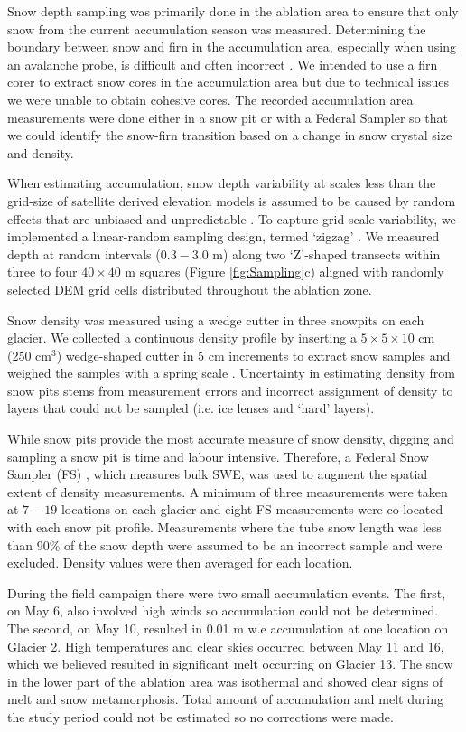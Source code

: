 \documentclass[twocolumn,letterpaper]{igs}
\begin{document}
Snow depth sampling was primarily done in the ablation area to ensure that only snow from the current accumulation season was measured. Determining the boundary between snow and firn in the accumulation area, especially when using an avalanche probe, is difficult and often incorrect \citep{Grunewald2010,Sold2013}. We intended to use a firn corer to extract snow cores in the accumulation area but due to technical issues we were unable to obtain cohesive cores. The recorded accumulation area measurements were done either in a snow pit or with a Federal Sampler so that we could identify the snow-firn transition based on a change in snow crystal size and density. 

When estimating accumulation, snow depth variability at scales less than the grid-size of satellite derived elevation models is assumed to be caused by random effects that are unbiased and unpredictable \citep{Watson2006}. To capture grid-scale variability, we implemented a linear-random sampling design, termed `zigzag' \citep{Shea2010}. We measured depth at random intervals ($0.3 - 3.0$ m) along two `Z'-shaped transects within three to four $40\times40$ m squares (Figure \ref{fig:Sampling}c) aligned with randomly selected DEM grid cells distributed throughout the ablation zone.

Snow density was measured using a wedge cutter in three snowpits on each glacier. We collected a continuous density profile by inserting a $5\times5\times 10$ cm (250 cm$^3$) wedge-shaped cutter in 5 cm increments to extract snow samples and weighed the samples with a spring scale \citep[e.g.][]{Gray1981,Fierz2009}. Uncertainty in estimating density from snow pits stems from measurement errors and incorrect assignment of density to layers that could not be sampled (i.e. ice lenses and `hard' layers). 

While snow pits provide the most accurate measure of snow density, digging and sampling a snow pit is time and labour intensive. Therefore, a Federal Snow Sampler (FS) \citep{Clyde1932}, which measures bulk SWE, was used to augment the spatial extent of density measurements. A minimum of three measurements were taken at $7-19$ locations on each glacier and eight FS measurements were co-located with each snow pit profile. Measurements where the tube snow length was less than 90\% of the snow depth were assumed to be an incorrect sample and were excluded. Density values were then averaged for each location. 

During the field campaign there were two small accumulation events. The first, on May 6, also involved high winds so accumulation could not be determined. The second, on May 10, resulted in 0.01 m w.e accumulation at one location on Glacier 2. High temperatures and clear skies occurred between May 11 and 16, which we believed resulted in significant melt occurring on Glacier 13. The snow in the lower part of the ablation area was isothermal and showed clear signs of melt and snow metamorphosis. Total amount of accumulation and melt during the study period could not be estimated so no corrections were made. 
\end{document}
